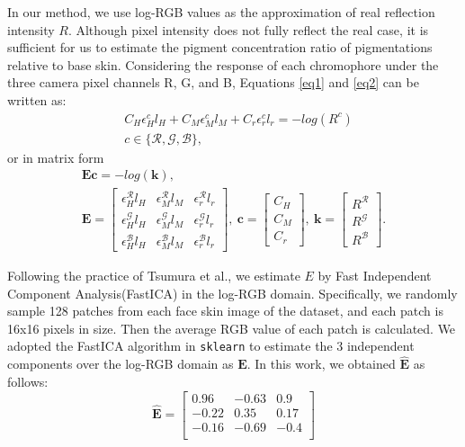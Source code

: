 \begin{spacing}{1.5}
In our method, we use log-RGB values as the approximation of real reflection intensity $R$. Although pixel intensity does not fully reflect the real case, it is sufficient for us to estimate the pigment concentration ratio of pigmentations relative to base skin. Considering the response of each chromophore under the three camera pixel channels R, G, and B, Equations \ref{eq1} and \ref{eq2} can be written as:
\begin{equation}
    \begin{aligned}
         & C_H\epsilon_H^c l_H + C_M\epsilon_M^c l_M + C_r\epsilon_r^c l_r = -log(R^c) \\
         & c\in\{\mathcal{R},\mathcal{G},\mathcal{B}\},
    \end{aligned}
\end{equation}
or in matrix form
\begin{gather*}
    \mathbf{E}\mathbf{c}=-log(\mathbf{k}),\\
    \mathbf{E}=\begin{bmatrix}
        \epsilon_H^\mathcal{R} l_H & \epsilon_M^\mathcal{R} l_M & \epsilon_r^\mathcal{R} l_r \\
        \epsilon_H^\mathcal{G} l_H & \epsilon_M^\mathcal{G} l_M & \epsilon_r^\mathcal{G} l_r \\
        \epsilon_H^\mathcal{B} l_H & \epsilon_M^\mathcal{B} l_M & \epsilon_r^\mathcal{B} l_r
    \end{bmatrix},\
    \mathbf{c}=\begin{bmatrix}C_H \\C_M \\C_r\end{bmatrix},\
    \mathbf{k}=\begin{bmatrix}R^\mathcal{R} \\R^\mathcal{G} \\R^\mathcal{B}\end{bmatrix}.
\end{gather*}

Following the practice of Tsumura et al.\cite{tsumura1999independent}, we estimate $E$ by Fast Independent Component Analysis(FastICA)\cite{HYVARINEN2000411} in the log-RGB domain. Specifically, we randomly sample 128 patches from each face skin image of the dataset, and each patch is 16x16 pixels in size. Then the average RGB value of each patch is calculated. We adopted the FastICA algorithm in \texttt{sklearn}\cite{scikit-learn} to estimate the 3 independent components over the log-RGB domain as $\mathbf{E}$. In this work, we obtained $\hat{\mathbf{E}}$ as follows:
\begin{equation}
    \hat{\mathbf{E}} = \begin{bmatrix}
        0.96  & -0.63 & 0.9  \\
        -0.22 & 0.35  & 0.17 \\
        -0.16 & -0.69 & -0.4 \\
    \end{bmatrix}
\end{equation}


\end{spacing}
